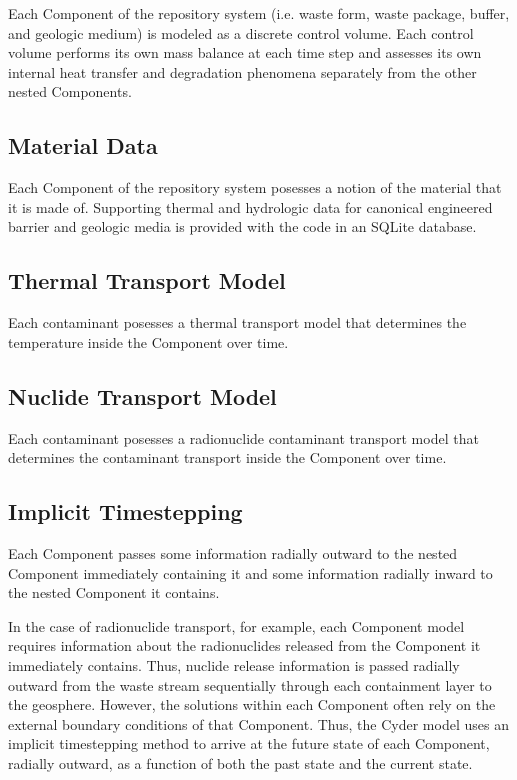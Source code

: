Each Component of the repository system (i.e. waste form, waste package, buffer, 
and geologic medium) is modeled as a discrete control volume. Each control 
volume performs its own mass balance at each time step and assesses its own 
internal  heat transfer and degradation phenomena separately from the other 
nested Components.

\subsection{Material Data}

Each Component of the repository system posesses a notion of the material that 
it is made of. Supporting thermal and hydrologic data for canonical engineered 
barrier and geologic media is provided with the code in an SQLite database. 

\subsection{Thermal Transport Model}

Each contaminant posesses a thermal transport model that determines the 
temperature inside the Component over time. 

\subsection{Nuclide Transport Model}

Each contaminant posesses a radionuclide contaminant transport model that determines the 
contaminant transport inside the Component over time. 

\subsection{Implicit Timestepping}

Each Component passes some information radially outward to the nested 
Component immediately containing it and some information radially 
inward to the nested Component it contains. 


In the case of radionuclide transport, for example, each Component model
requires information about the radionuclides released from the Component it
immediately contains.  Thus, nuclide release information is passed radially
outward from the waste stream sequentially through each containment layer to
the geosphere. However, the solutions within each Component often rely on the
external boundary conditions of that Component.  Thus, the Cyder model uses an
implicit timestepping method to arrive at the future state of each Component,
radially outward, as a function of both the past state and the current state. 

